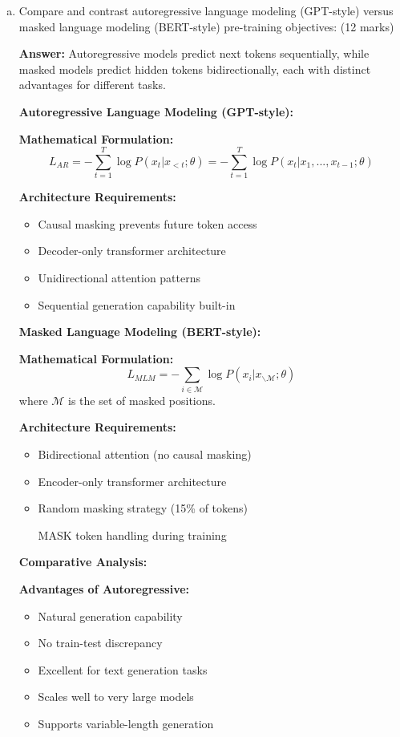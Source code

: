 \documentclass[12pt]{article}
\newcommand{\answer}[1]{{\color{answercolor}\textbf{Answer:} #1}}
\newcommand{\explanation}[1]{{\color{explanationcolor}#1}}
\begin{document}
\begin{center}
\begin{enumerate}[(a)]
    \item Compare and contrast autoregressive language modeling (GPT-style) versus masked language modeling (BERT-style) pre-training objectives: \hfill (12 marks)
    
    \answer{Autoregressive models predict next tokens sequentially, while masked models predict hidden tokens bidirectionally, each with distinct advantages for different tasks.}
    
    \explanation{
    \textbf{Autoregressive Language Modeling (GPT-style):}
    
    \textbf{Mathematical Formulation:}
    $$L_{AR} = -\sum_{t=1}^T \log P(x_t | x_{<t}; \theta) = -\sum_{t=1}^T \log P(x_t | x_1, ..., x_{t-1}; \theta)$$
    
    \textbf{Architecture Requirements:}
    \begin{itemize}
        \item Causal masking prevents future token access
        \item Decoder-only transformer architecture
        \item Unidirectional attention patterns
        \item Sequential generation capability built-in
    \end{itemize}
    
    \textbf{Masked Language Modeling (BERT-style):}
    
    \textbf{Mathematical Formulation:}
    $$L_{MLM} = -\sum_{i \in \mathcal{M}} \log P(x_i | x_{\backslash \mathcal{M}}; \theta)$$
    where $\mathcal{M}$ is the set of masked positions.
    
    \textbf{Architecture Requirements:}
    \begin{itemize}
        \item Bidirectional attention (no causal masking)
        \item Encoder-only transformer architecture
        \item Random masking strategy (15\% of tokens)
        \item [MASK] token handling during training
    \end{itemize}
    
    \textbf{Comparative Analysis:}
    
    \textbf{Advantages of Autoregressive:}
    \begin{itemize}
        \item Natural generation capability
        \item No train-test discrepancy
        \item Excellent for text generation tasks
        \item Scales well to very large models
        \item Supports variable-length generation
    \end{itemize}
    
}
\end{enumerate}
\end{center}
\end{document}
